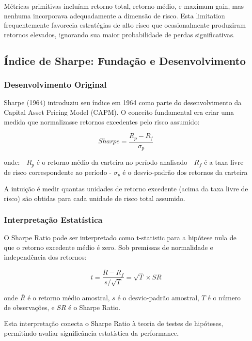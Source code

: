 Métricas primitivas incluíam retorno total, retorno médio, e maximum gain, mas nenhuma incorporava adequadamente a dimensão de risco. Esta limitation frequentemente favorecia estratégias de alto risco que ocasionalmente produziram retornos elevados, ignorando sua maior probabilidade de perdas significativas.

\subsection{Índice de Sharpe: Fundação e Desenvolvimento}

\subsubsection{Desenvolvimento Original}

Sharpe (1964) introduziu seu índice em 1964 como parte do desenvolvimento da Capital Asset Pricing Model (CAPM). O conceito fundamental era criar uma medida que normalizasse retornos excedentes pelo risco assumido:

\begin{equation}
Sharpe = \frac{R_p - R_f}{\sigma_p}
\end{equation}

onde:
- $R_p$ é o retorno médio da carteira no período analisado
- $R_f$ é a taxa livre de risco correspondente ao período
- $\sigma_p$ é o desvio-padrão dos retornos da carteira

A intuição é medir quantas unidades de retorno excedente (acima da taxa livre de risco) são obtidas para cada unidade de risco total assumido.

\subsubsection{Interpretação Estatística}

O Sharpe Ratio pode ser interpretado como t-statistic para a hipótese nula de que o retorno excedente médio é zero. Sob premissas de normalidade e independência dos retornos:

\begin{equation}
t = \frac{\bar{R} - R_f}{s/\sqrt{T}} = \sqrt{T} \times SR
\end{equation}

onde $\bar{R}$ é o retorno médio amostral, $s$ é o desvio-padrão amostral, $T$ é o número de observações, e $SR$ é o Sharpe Ratio.

Esta interpretação conecta o Sharpe Ratio à teoria de testes de hipóteses, permitindo avaliar significância estatística da performance.


